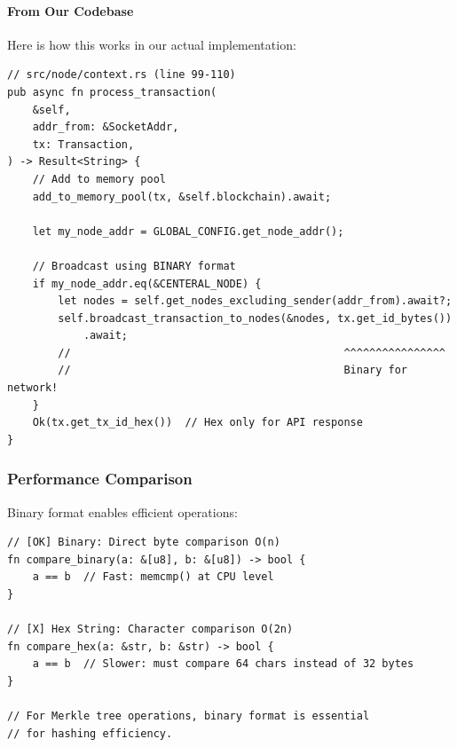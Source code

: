 \needspace{3in}
\paragraph{From Our Codebase}
Here is how this works in our actual implementation:

\begin{listing}[H]
\caption{Transaction processing with binary IDs}
\label{lst:ch06-4}
\begin{verbatim}
// src/node/context.rs (line 99-110)
pub async fn process_transaction(
    &self,
    addr_from: &SocketAddr,
    tx: Transaction,
) -> Result<String> {
    // Add to memory pool
    add_to_memory_pool(tx, &self.blockchain).await;

    let my_node_addr = GLOBAL_CONFIG.get_node_addr();

    // Broadcast using BINARY format
    if my_node_addr.eq(&CENTERAL_NODE) {
        let nodes = self.get_nodes_excluding_sender(addr_from).await?;
        self.broadcast_transaction_to_nodes(&nodes, tx.get_id_bytes())
            .await;
        //                                           ^^^^^^^^^^^^^^^^
        //                                           Binary for network!
    }
    Ok(tx.get_tx_id_hex())  // Hex only for API response
}
\end{verbatim}
\end{listing}

\needspace{4in}
\subsubsection{Performance Comparison}
\label{sec:ch06-performance-comparison}

Binary format enables efficient operations:

\begin{listing}[H]
\caption{Binary vs hex comparison performance}
\label{lst:ch06-5}
\begin{verbatim}
// [OK] Binary: Direct byte comparison O(n)
fn compare_binary(a: &[u8], b: &[u8]) -> bool {
    a == b  // Fast: memcmp() at CPU level
}

// [X] Hex String: Character comparison O(2n)
fn compare_hex(a: &str, b: &str) -> bool {
    a == b  // Slower: must compare 64 chars instead of 32 bytes
}

// For Merkle tree operations, binary format is essential
// for hashing efficiency.
\end{verbatim}
\end{listing}

